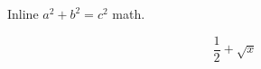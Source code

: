 \documentclass{article}
\begin{document}
Inline $a^2+b^2=c^2$ math.

\begin{equation}
  \frac{1}{2} + \sqrt{x}
\end{equation}
\end{document}
